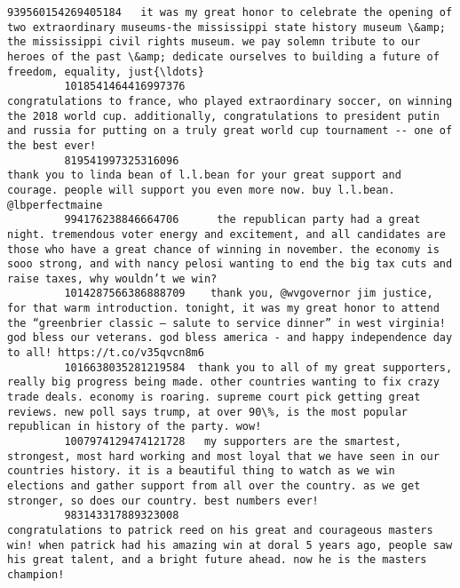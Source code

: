 \documentclass[11pt]{article}
\begin{document}
\begin{Verbatim}[commandchars=\\\{\}]
         939560154269405184   it was my great honor to celebrate the opening of two extraordinary museums-the mississippi state history museum \&amp; the mississippi civil rights museum. we pay solemn tribute to our heroes of the past \&amp; dedicate ourselves to building a future of freedom, equality, just{\ldots}   
         1018541464416997376                                                        congratulations to france, who played extraordinary soccer, on winning the 2018 world cup. additionally, congratulations to president putin and russia for putting on a truly great world cup tournament -- one of the best ever!   
         819541997325316096                                                                                                                                              thank you to linda bean of l.l.bean for your great support and courage. people will support you even more now. buy l.l.bean. @lbperfectmaine   
         994176238846664706      the republican party had a great night. tremendous voter energy and excitement, and all candidates are those who have a great chance of winning in november. the economy is sooo strong, and with nancy pelosi wanting to end the big tax cuts and raise taxes, why wouldn’t we win?   
         1014287566386888709    thank you, @wvgovernor jim justice, for that warm introduction. tonight, it was my great honor to attend the “greenbrier classic – salute to service dinner” in west virginia! god bless our veterans. god bless america - and happy independence day to all! https://t.co/v35qvcn8m6   
         1016638035281219584  thank you to all of my great supporters, really big progress being made. other countries wanting to fix crazy trade deals. economy is roaring. supreme court pick getting great reviews. new poll says trump, at over 90\%, is the most popular republican in history of the party. wow!   
         1007974129474121728   my supporters are the smartest, strongest, most hard working and most loyal that we have seen in our countries history. it is a beautiful thing to watch as we win elections and gather support from all over the country. as we get stronger, so does our country. best numbers ever!   
         983143317889323008                                                                   congratulations to patrick reed on his great and courageous masters win! when patrick had his amazing win at doral 5 years ago, people saw his great talent, and a bright future ahead. now he is the masters champion!   
         

\end{Verbatim}
\end{document}
